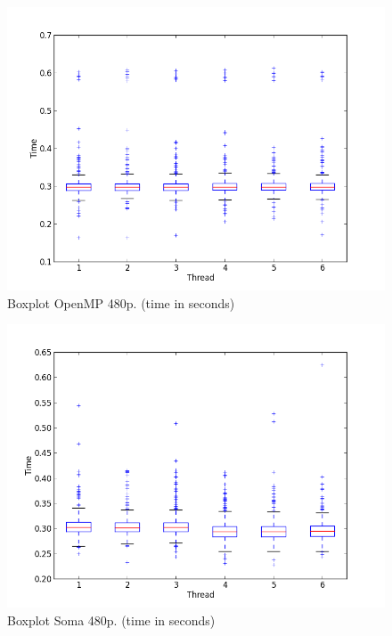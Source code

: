 \documentclass[a4paper,12pt,oneside]{book}
\begin{document}
\begin{figure}[H]
\centering
\includegraphics[scale=0.55]{omp_time_480txtbox.png}
\caption{Boxplot OpenMP 480p. (time in seconds)}
\label{box480omp}
\end{figure}

\begin{figure}[H]
\centering
\includegraphics[scale=0.55]{soma_time_480txtbox.png}
\caption{Boxplot Soma 480p. (time in seconds)}
\label{box480soma}
\end{figure}
\end{document}
